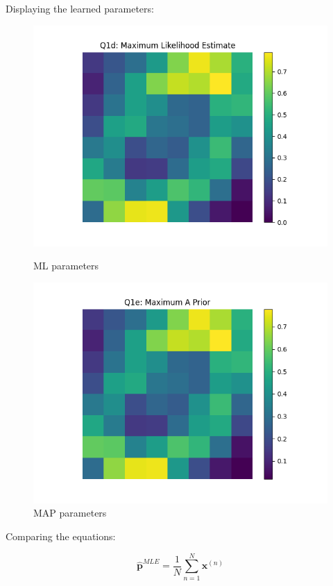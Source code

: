 \documentclass[12pt]{article}
\begin{document}
\begin{enumerate}
Displaying the learned parameters:
\begin{figure}[h]
\centering
\begin{minipage}{0.5\textwidth}
  \centering
  \includegraphics[scale=0.5]{outputs/q1/q1d}
  \caption{ML parameters}
  \label{fig:1d}
\end{minipage}%
\begin{minipage}{0.5\textwidth}
  \centering
  \includegraphics[scale=0.5]{outputs/q1/q1e}
  \caption{MAP parameters}
  \label{fig:1e}
\end{minipage}
\end{figure}

Comparing the equations:

    $$\hat{\textbf{p}}^{MLE} = \frac{1}{N}\sum_{n=1}^{N} \textbf{x}^{(n)}$$


\end{enumerate}
\end{document}
